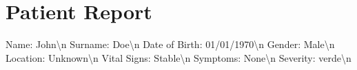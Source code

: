 \documentclass{article}%
\begin{document}
%
\normalsize%
\section{Patient Report}%
\label{sec:PatientReport}%
Name: John\textbackslash{}n%
Surname: Doe\textbackslash{}n%
Date of Birth: 01/01/1970\textbackslash{}n%
Gender: Male\textbackslash{}n%
Location: Unknown\textbackslash{}n%
Vital Signs: Stable\textbackslash{}n%
Symptoms: None\textbackslash{}n%
Severity: verde\textbackslash{}n

%
\end{document}
